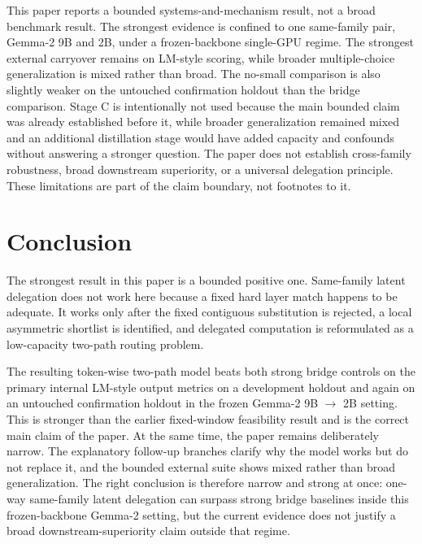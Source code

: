 \documentclass[11pt]{article}
\begin{document}
This paper reports a bounded systems-and-mechanism result, not a broad benchmark result. The strongest evidence is confined to one same-family pair, Gemma-2 9B and 2B, under a frozen-backbone single-GPU regime. The strongest external carryover remains on LM-style scoring, while broader multiple-choice generalization is mixed rather than broad. The no-small comparison is also slightly weaker on the untouched confirmation holdout than the bridge comparison. Stage C is intentionally not used because the main bounded claim was already established before it, while broader generalization remained mixed and an additional distillation stage would have added capacity and confounds without answering a stronger question. The paper does not establish cross-family robustness, broad downstream superiority, or a universal delegation principle. These limitations are part of the claim boundary, not footnotes to it.

\section{Conclusion}

The strongest result in this paper is a bounded positive one. Same-family latent delegation does not work here because a fixed hard layer match happens to be adequate. It works only after the fixed contiguous substitution is rejected, a local asymmetric shortlist is identified, and delegated computation is reformulated as a low-capacity two-path routing problem.

The resulting token-wise two-path model beats both strong bridge controls on the primary internal LM-style output metrics on a development holdout and again on an untouched confirmation holdout in the frozen Gemma-2 9B $\rightarrow$ 2B setting. This is stronger than the earlier fixed-window feasibility result and is the correct main claim of the paper. At the same time, the paper remains deliberately narrow. The explanatory follow-up branches clarify why the model works but do not replace it, and the bounded external suite shows mixed rather than broad generalization. The right conclusion is therefore narrow and strong at once: one-way same-family latent delegation can surpass strong bridge baselines inside this frozen-backbone Gemma-2 setting, but the current evidence does not justify a broad downstream-superiority claim outside that regime.

\appendix




\end{document}
